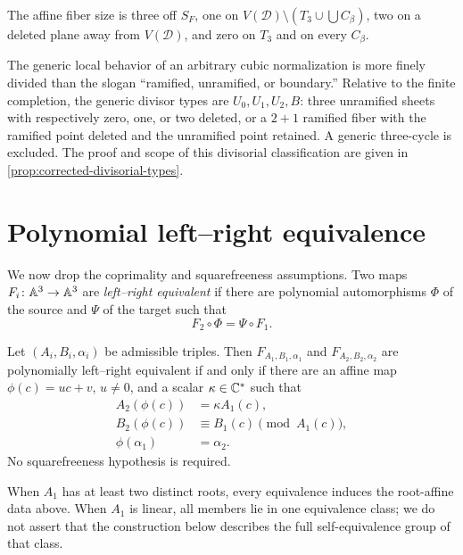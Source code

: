 \documentclass[11pt,reqno]{amsart}
\begin{document}
\begin{corollary}
\label{cor:fiber-table}
The affine fiber size is three off \(S_F\), one on
\(V(\mathcal D)\setminus(T_3\cup\bigcup C_\beta)\), two on a deleted
plane away from \(V(\mathcal D)\), and zero on \(T_3\) and on every
\(C_\beta\).
\end{corollary}

\begin{remark}
\label{rem:lost-sheet-types}
The generic local behavior of an arbitrary cubic normalization is more
finely divided than the slogan ``ramified, unramified, or boundary.''  Relative
to the finite completion, the generic divisor types are \(U_0,U_1,U_2,B\):
three unramified sheets with respectively zero, one, or two deleted, or a
\(2+1\) ramified fiber with the ramified point deleted and the unramified
point retained.  A generic three-cycle is excluded.  The proof and scope of
this divisorial classification are given in
\cref{prop:corrected-divisorial-types}.
\end{remark}

\section{Polynomial left--right equivalence}
\label{sec:equivalence}

We now drop the coprimality and squarefreeness assumptions.  Two maps
\(F_i\colon\mathbb A^3\to\mathbb A^3\) are \emph{left--right equivalent} if there are
polynomial automorphisms \(\Phi\) of the source and \(\Psi\) of the target
such that
\[
F_2\circ\Phi=\Psi\circ F_1.
\]

\begin{theorem}
\label{thm:equivalence}
Let \((A_i,B_i,\alpha_i)\) be admissible triples.  Then
\(F_{A_1,B_1,\alpha_1}\) and \(F_{A_2,B_2,\alpha_2}\) are polynomially
left--right equivalent if and only if there are an affine map
\(\phi(c)=uc+v\), \(u\ne0\), and a scalar \(\kappa\in\mathbb C^*\) such that
\begin{align}
A_2(\phi(c))&=\kappa A_1(c),\label{eq:eq-A}\\
B_2(\phi(c))&\equiv B_1(c)\pmod{A_1(c)},\label{eq:eq-B}\\
\phi(\alpha_1)&=\alpha_2.\label{eq:eq-alpha}
\end{align}
No squarefreeness hypothesis is required.

When \(A_1\) has at least two distinct roots, every equivalence induces the
root-affine data above.  When \(A_1\) is linear, all members lie in one
equivalence class; we do not assert that the construction below describes
the full self-equivalence group of that class.
\end{theorem}
\end{document}
